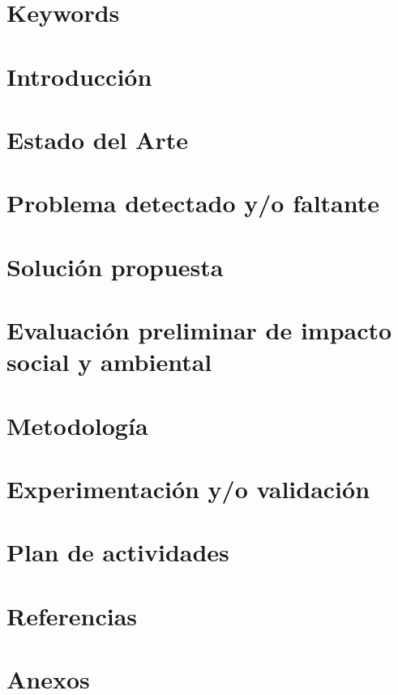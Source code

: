 \documentclass[a4paper,11pt]{article}
\begin{document}

\newpage

\section{Keywords}

\section{Introducción}

\section{Estado del Arte}

\section{Problema detectado y/o faltante}

\section{Solución propuesta}

\section{Evaluación preliminar de impacto social y ambiental}

\section{Metodología}

\section{Experimentación y/o validación}

\section{Plan de actividades}

\section{Referencias}

\section{Anexos}
\end{document}

